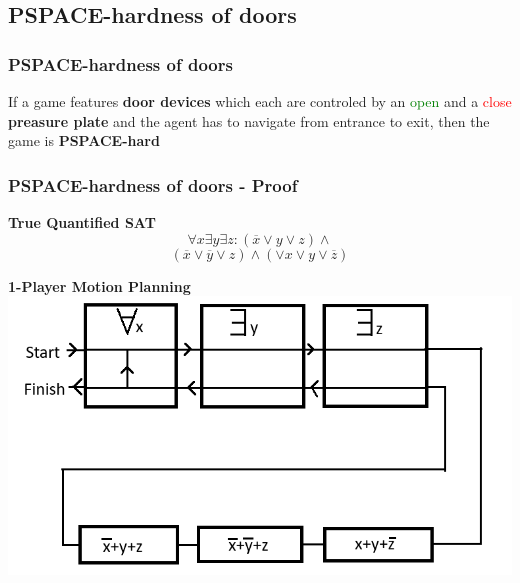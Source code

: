 \documentclass{beamer}
\begin{document}
\subsection{PSPACE-hardness of doors}
\begin{frame}
  \frametitle{PSPACE-hardness of doors}
  \begin{theorem}
    If a game features \textbf{door devices} which each are controled by an
    \textcolor{green}{open} and a \textcolor{red}{close} \textbf{preasure plate}
    and the agent has to navigate from entrance to exit, then the game is
    \textbf{PSPACE-hard}
  \end{theorem}
\end{frame}
\begin{frame}
  \frametitle{PSPACE-hardness of doors - Proof}
  \begin{minipage}[t]{0.48\textwidth}
    \textbf{True Quantified SAT}
    \[ \forall x \exists y \exists z :  (\overline{x} \lor y \lor z) \land \]
    \[ (\overline{x} \lor \overline{y} \lor z) \land (\lor x \lor y \lor \overline{z}) \]
  \end{minipage}
  \begin{minipage}[t]{0.48\textwidth}
    \textbf{1-Player Motion Planning}
    \includegraphics[width=1.20\textwidth]{res/prove/Conversion.png}
  \end{minipage}
\end{frame}
\end{document}
